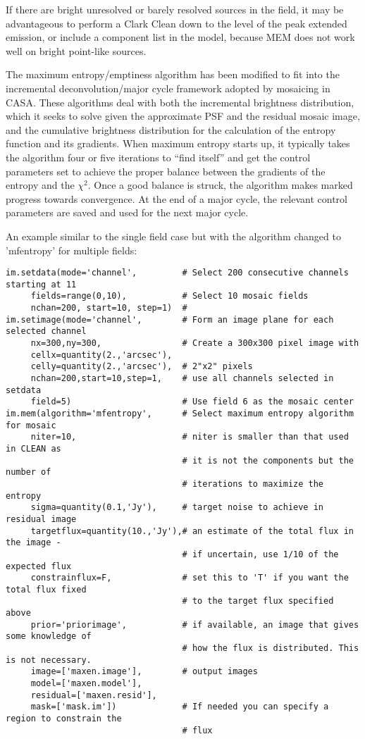 \vspace{3mm}

If there are bright unresolved or barely resolved sources in the field,
it may be advantageous to perform a Clark Clean down to the level of the
peak extended emission, or include a component list in the model,
because MEM does not work well on bright point-like sources.

The maximum entropy/emptiness algorithm has been modified to fit into
the incremental deconvolution/major cycle framework adopted by
mosaicing in CASA.  These algorithms deal with both the incremental
brightness distribution, which it seeks to solve given the approximate
PSF and the residual mosaic image, and the cumulative brightness
distribution for the calculation of the entropy function and its
gradients.  When maximum entropy starts up, it typically takes the
algorithm four or five iterations to ``find itself'' and get the
control parameters set to achieve the proper balance between the
gradients of the entropy and the $\chi^2$.  Once a good balance is
struck, the algorithm makes marked progress towards convergence.  At
the end of a major cycle, the relevant control parameters are saved
and used for the next major cycle.

An example similar to the single field case but with the algorithm
changed to 'mfentropy' for multiple fields:


\small
\begin{verbatim}
im.setdata(mode='channel',         # Select 200 consecutive channels starting at 11
     fields=range(0,10),           # Select 10 mosaic fields
     nchan=200, start=10, step=1)  #
im.setimage(mode='channel',        # Form an image plane for each selected channel
     nx=300,ny=300,                # Create a 300x300 pixel image with
     cellx=quantity(2.,'arcsec'),
     celly=quantity(2.,'arcsec'),  # 2"x2" pixels
     nchan=200,start=10,step=1,    # use all channels selected in setdata
     field=5)                      # Use field 6 as the mosaic center
im.mem(algorithm='mfentropy',      # Select maximum entropy algorithm for mosaic
     niter=10,                     # niter is smaller than that used in CLEAN as
                                   # it is not the components but the number of
                                   # iterations to maximize the entropy
     sigma=quantity(0.1,'Jy'),     # target noise to achieve in residual image
     targetflux=quantity(10.,'Jy'),# an estimate of the total flux in the image -
                                   # if uncertain, use 1/10 of the expected flux
     constrainflux=F,              # set this to 'T' if you want the total flux fixed
                                   # to the target flux specified above
     prior='priorimage',           # if available, an image that gives some knowledge of
                                   # how the flux is distributed. This is not necessary.
     image=['maxen.image'],        # output images
     model=['maxen.model'],
     residual=['maxen.resid'],
     mask=['mask.im'])             # If needed you can specify a region to constrain the
                                   # flux
\end{verbatim}
\normalsize 


